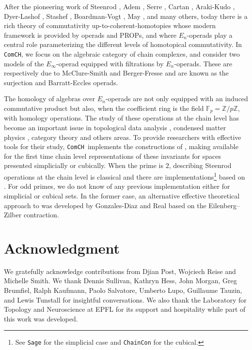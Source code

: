 \documentclass{amsart}
\newcommand{\comch}{\texttt{ComCH}}
\begin{document}
After the pioneering work of Steenrod \cite{Steenrod47, Steenrod62}, Adem \cite{Adem52}, Serre \cite{Serre53}, Cartan \cite{Cartan55}, Araki-Kudo \cite{ArakiKudo56}, Dyer-Lashof \cite{DyerLashof62}, Stashef \cite{Stasheff63}, Boardman-Vogt \cite{BoardmanVogt73}, May \cite{May70algebraic, May72geometry}, and many others, today there is a rich theory of commutativity up-to-coherent-homotopies whose modern framework is provided by operads and PROPs, and where $E_n$-operads play a central role parameterizing the different levels of homotopical commutativity. In \comch, we focus on the algebraic category of chain complexes, and consider two models of the $E_\infty$-operad equipped with filtrations by $E_n$-operads. These are respectively due to McClure-Smith \cite{McClureSmith03} and Berger-Fresse \cite{BergerFresse04} and are known as the surjection and Barratt-Eccles operads.

The homology of algebras over $E_n$-operads are not only equipped with an induced commutative product but also, when the coefficient ring is the field $\mathbb F_p = \mathbb Z/ p\mathbb Z$, with homology operations. The study of these operations at the chain level has become an important issue in topological data analysis \cite{medina2018persistence}, condensed matter physics \cite{Kapustin2017}, category theory \cite{medina2020globular} and others areas. To provide researchers with effective tools for their study, \comch\, implements the constructions of \cite{medina2020chain}, making available for the first time chain level representations of these invariants for spaces presented simplicially or cubically. When the prime is $2$, describing Steenrod operations at the chain level is classical and there are implementations\footnote{See \texttt{Sage} for the simplicial case and \texttt{ChainCon} for the cubical.} based on \cite{GonReal1999, Pilarczyk2016}. For odd primes, we do not know of any previous implementation either for simplicial or cubical sets. In the former case, an alternative effective theoretical approach to \cite{medina2020chain} was developed by Gonzales-Diaz and Real \cite{GonReal2003, GonReal2005} based on the Eilenberg–Zilber contraction.

\section*{Acknowledgment}
We gratefully acknowledge contributions from Djian Post, Wojciech Reise and Michelle Smith. We thank Dennis Sullivan, Kathryn Hess, John Morgan, Greg Brumfiel, Ralph Kaufmann, Paolo Salvatore, Umberto Lupo, Guillaume Tauzin, and Lewis Tunstall for insightful conversations. We also thank the Laboratory for Topology and Neuroscience at EPFL for its support and hospitality while part of this work was developed.
\end{document}
